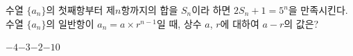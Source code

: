 수열 $\{a_n\}$의 첫째항부터 제$n$항까지의 합을 $S_n$이라 하면 $2S_n+1=5^n$을 만족시킨다. 수열 $\{a_n\}$의 일반항이 $a_n=a\times r^{n-1}$일 때, 상수 $a$, $r$에 대하여 $a-r$의 값은?
\begin{choices32}{$-4$}{$-3$}{$-2$}{$-1$}{$0$}\end{choices32}

